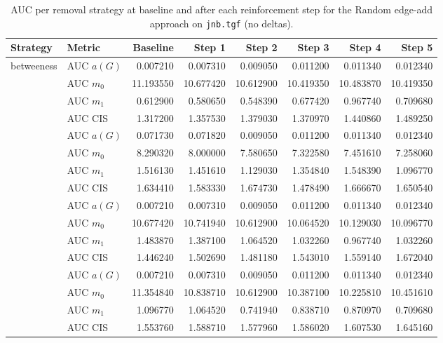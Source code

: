 \begin{table}[htbp]
  \centering
  \caption{AUC per removal strategy at baseline and after each reinforcement step for the Random edge-add approach on \texttt{jnb.tgf} (no deltas).}
  \label{tab:jnb-random_add-auc}
  \begin{tabular}{llrrrrrr}
    \toprule
    \textbf{Strategy} & \textbf{Metric} & \textbf{Baseline} & \textbf{Step 1} & \textbf{Step 2} & \textbf{Step 3} & \textbf{Step 4} & \textbf{Step 5} \\
    \midrule
    \multirow{4}{*}{betweeness} & AUC $a(G)$ & 0.007210 & 0.007310 & 0.009050 & 0.011200 & 0.011340 & 0.012340 \\
    & AUC $m_0$ & 11.193550 & 10.677420 & 10.612900 & 10.419350 & 10.483870 & 10.419350 \\
    & AUC $m_1$ & 0.612900 & 0.580650 & 0.548390 & 0.677420 & 0.967740 & 0.709680 \\
    & AUC CIS & 1.317200 & 1.357530 & 1.379030 & 1.370970 & 1.440860 & 1.489250 \\
    \addlinespace
    \multirow{4}{*}{closeness} & AUC $a(G)$ & 0.071730 & 0.071820 & 0.009050 & 0.011200 & 0.011340 & 0.012340 \\
    & AUC $m_0$ & 8.290320 & 8.000000 & 7.580650 & 7.322580 & 7.451610 & 7.258060 \\
    & AUC $m_1$ & 1.516130 & 1.451610 & 1.129030 & 1.354840 & 1.548390 & 1.096770 \\
    & AUC CIS & 1.634410 & 1.583330 & 1.674730 & 1.478490 & 1.666670 & 1.650540 \\
    \addlinespace
    \multirow{4}{*}{core influence} & AUC $a(G)$ & 0.007210 & 0.007310 & 0.009050 & 0.011200 & 0.011340 & 0.012340 \\
    & AUC $m_0$ & 10.677420 & 10.741940 & 10.612900 & 10.064520 & 10.129030 & 10.096770 \\
    & AUC $m_1$ & 1.483870 & 1.387100 & 1.064520 & 1.032260 & 0.967740 & 1.032260 \\
    & AUC CIS & 1.446240 & 1.502690 & 1.481180 & 1.543010 & 1.559140 & 1.672040 \\
    \addlinespace
    \multirow{4}{*}{degree} & AUC $a(G)$ & 0.007210 & 0.007310 & 0.009050 & 0.011200 & 0.011340 & 0.012340 \\
    & AUC $m_0$ & 11.354840 & 10.838710 & 10.612900 & 10.387100 & 10.225810 & 10.451610 \\
    & AUC $m_1$ & 1.096770 & 1.064520 & 0.741940 & 0.838710 & 0.870970 & 0.709680 \\
    & AUC CIS & 1.553760 & 1.588710 & 1.577960 & 1.586020 & 1.607530 & 1.645160 \\

\end{tabular}
\end{table}
